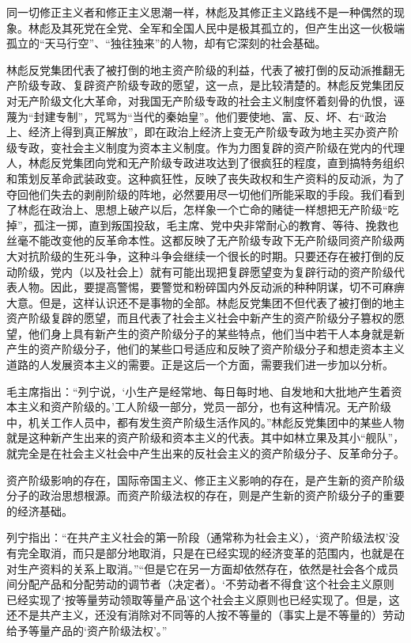 \begin{maonote}
同一切修正主义者和修正主义思潮一样，林彪及其修正主义路线不是一种偶然的现象。林彪及其死党在全党、全军和全国人民中是极其孤立的，但产生出这一伙极端孤立的“天马行空”、“独往独来”的人物，却有它深刻的社会基础。

林彪反党集团代表了被打倒的地主资产阶级的利益，代表了被打倒的反动派推翻无产阶级专政、复辟资产阶级专政的愿望，这一点，是比较清楚的。林彪反党集团反对无产阶级文化大革命，对我国无产阶级专政的社会主义制度怀着刻骨的仇恨，诬蔑为“封建专制”，咒骂为“当代的秦始皇”。他们要使地、富、反、坏、右“政治上、经济上得到真正解放”，即在政治上经济上变无产阶级专政为地主买办资产阶级专政，变社会主义制度为资本主义制度。作为力图复辟的资产阶级在党内的代理人，林彪反党集团向党和无产阶级专政进攻达到了很疯狂的程度，直到搞特务组织和策划反革命武装政变。这种疯狂性，反映了丧失政权和生产资料的反动派，为了夺回他们失去的剥削阶级的阵地，必然要用尽一切他们所能采取的手段。我们看到了林彪在政治上、思想上破产以后，怎样象一个亡命的赌徒一样想把无产阶级“吃掉”，孤注一掷，直到叛国投敌，毛主席、党中央非常耐心的教育、等待、挽救也丝毫不能改变他的反革命本性。这都反映了无产阶级专政下无产阶级同资产阶级两大对抗阶级的生死斗争，这种斗争会继续一个很长的时期。只要还存在被打倒的反动阶级，党内（以及社会上）就有可能出现把复辟愿望变为复辟行动的资产阶级代表人物。因此，要提高警惕，要警觉和粉碎国内外反动派的种种阴谋，切不可麻痹大意。但是，这样认识还不是事物的全部。林彪反党集团不但代表了被打倒的地主资产阶级复辟的愿望，而且代表了社会主义社会中新产生的资产阶级分子篡权的愿望，他们身上具有新产生的资产阶级分子的某些特点，他们当中若干人本身就是新产生的资产阶级分子，他们的某些口号适应和反映了资产阶级分子和想走资本主义道路的人发展资本主义的需要。正是这后一个方面，需要我们进一步加以分析。

毛主席指出：“列宁说，‘小生产是经常地、每日每时地、自发地和大批地产生着资本主义和资产阶级的。’工人阶级一部分，党员一部分，也有这种情况。无产阶级中，机关工作人员中，都有发生资产阶级生活作风的。”林彪反党集团中的某些人物就是这种新产生出来的资产阶级和资本主义的代表。其中如林立果及其小“舰队”，就完全是在社会主义社会中产生出来的反社会主义的资产阶级分子、反革命分子。

资产阶级影响的存在，国际帝国主义、修正主义影响的存在，是产生新的资产阶级分子的政治思想根源。而资产阶级法权的存在，则是产生新的资产阶级分子的重要的经济基础。

列宁指出：“在共产主义社会的第一阶段（通常称为社会主义），‘资产阶级法权’没有完全取消，而只是部分地取消，只是在已经实现的经济变革的范围内，也就是在对生产资料的关系上取消。”“但是它在另一方面却依然存在，依然是社会各个成员间分配产品和分配劳动的调节者（决定者）。‘不劳动者不得食’这个社会主义原则已经实现了‘按等量劳动领取等量产品’这个社会主义原则也已经实现了。但是，这还不是共产主义，还没有消除对不同等的人按不等量的（事实上是不等量的）劳动给予等量产品的‘资产阶级法权’。”


\end{maonote}
